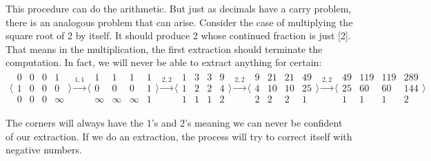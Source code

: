 \documentclass[12pt]{article}
\theoremstyle{remark}
\begin{document}
This procedure can do the arithmetic. But just as decimals have a carry problem, there is an analogous problem that can arise. Consider the case of multiplying the square root of 2 by itself. It should produce 2 whose continued fraction is just [2]. That means in the multiplication, the first extraction should terminate the computation. In fact, we will never be able to extract anything for certain: 
\begin{multline*}
 \big\langle\begin{smallmatrix}
  0 & 0 & 0 & 1\\
  1 & 0 & 0 & 0\\
  0 & 0 & 0 & \infty
\end{smallmatrix}\big\rangle
\xrightarrow{1, 1}
 \big\langle\begin{smallmatrix}
  1 & 1 & 1 & 1\\
  0 & 0 & 0 & 1\\
  \infty & \infty & \infty & 1
\end{smallmatrix}\big\rangle
\xrightarrow{2, 2}
 \big\langle\begin{smallmatrix}
  1 & 3 & 3 & 9\\
  1 & 2 & 2 & 4\\
  1 & 1 & 1 & 2
\end{smallmatrix}\big\rangle
\xrightarrow{2, 2}
 \big\langle\begin{smallmatrix}
  9 & 21 & 21 & 49\\
  4 & 10 & 10 & 25\\
  2 & 2 & 2 & 1
\end{smallmatrix}\big\rangle
\xrightarrow{2, 2}
 \big\langle\begin{smallmatrix}
  49 & 119 & 119 & 289\\
  25 & 60 & 60 & 144\\
  1 & 1 & 1 & 2
\end{smallmatrix}\big\rangle
\end{multline*}

The corners will always have the 1's and 2's meaning we can never be confident of our extraction. If we do an extraction, the process will try to correct itself with negative numbers. 
\end{document}
